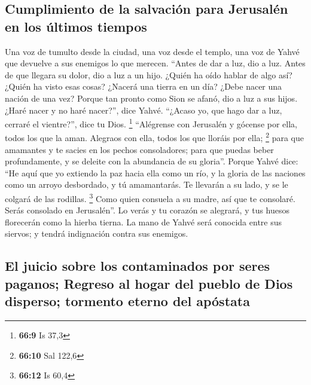 \begin{paracol}{2}
\hypertarget{cumplimiento-de-la-salvaciuxf3n-para-jerusaluxe9n-en-los-uxfaltimos-tiempos}{%
\subsection{Cumplimiento de la salvación para Jerusalén en los últimos
tiempos}\label{cumplimiento-de-la-salvaciuxf3n-para-jerusaluxe9n-en-los-uxfaltimos-tiempos}}

 Una voz de tumulto desde la ciudad, una voz desde el
templo, una voz de Yahvé que devuelve a sus enemigos lo que merecen.
 ``Antes de dar a luz, dio a luz. Antes de que llegara su
dolor, dio a luz a un hijo.  ¿Quién ha oído hablar de algo
así? ¿Quién ha visto esas cosas? ¿Nacerá una tierra en un día? ¿Debe
nacer una nación de una vez? Porque tan pronto como Sion se afanó, dio a
luz a sus hijos.  ¿Haré nacer y no haré nacer?'', dice
Yahvé. ``¿Acaso yo, que hago dar a luz, cerraré el vientre?'', dice tu
Dios. \footnote{\textbf{66:9} Is 37,3}  ``Alégrense con
Jerusalén y gócense por ella, todos los que la aman. Alegraos con ella,
todos los que lloráis por ella; \footnote{\textbf{66:10} Sal 122,6}
 para que amamantes y te sacies en los pechos
consoladores; para que puedas beber profundamente, y se deleite con la
abundancia de su gloria''.  Porque Yahvé dice: ``He aquí
que yo extiendo la paz hacia ella como un río, y la gloria de las
naciones como un arroyo desbordado, y tú amamantarás. Te llevarán a su
lado, y se le colgará de las rodillas. \footnote{\textbf{66:12} Is 60,4}
 Como quien consuela a su madre, así que te consolaré.
Serás consolado en Jerusalén''.  Lo verás y tu corazón se
alegrará, y tus huesos florecerán como la hierba tierna. La mano de
Yahvé será conocida entre sus siervos; y tendrá indignación contra sus
enemigos.

\hypertarget{el-juicio-sobre-los-contaminados-por-seres-paganos-regreso-al-hogar-del-pueblo-de-dios-disperso-tormento-eterno-del-apuxf3stata}{%
\subsection{El juicio sobre los contaminados por seres paganos; Regreso
al hogar del pueblo de Dios disperso; tormento eterno del
apóstata}\label{el-juicio-sobre-los-contaminados-por-seres-paganos-regreso-al-hogar-del-pueblo-de-dios-disperso-tormento-eterno-del-apuxf3stata}}


\end{paracol}
